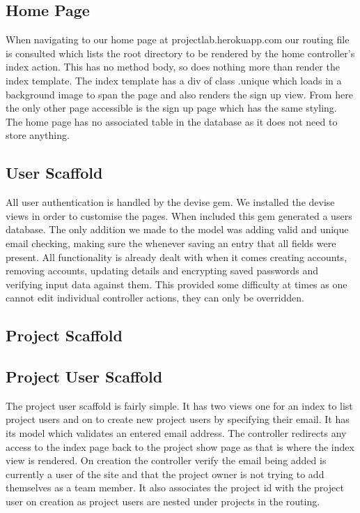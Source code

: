 \documentclass[a4wide, 11pt]{article}
\begin{document}
\subsection{Home Page}
When navigating to our home page at projectlab.herokuapp.com our routing file is consulted which lists the root directory to be rendered by the home controller’s index action. This has no method body, so does nothing more than render the index template. The index template has a div of class .unique which loads in a background image to span the page and also renders the sign up view. From here the only other page accessible is the sign up page which has the same styling. The home page has no associated table in the database as it does not need to store anything.

\subsection{User Scaffold}
All user authentication is handled by the devise gem. We installed the devise views in order to customise the pages. When included this gem generated a users database. The only addition we made to the model was adding valid and unique email checking, making sure the whenever saving an entry that all fields were present. All functionality is already dealt with when it comes creating accounts, removing accounts, updating details and encrypting saved passwords and verifying input data against them. This provided some difficulty at times as one cannot edit individual controller actions, they can only be overridden.

\subsection{Project Scaffold}

\subsection{Project User Scaffold}
The project user scaffold is fairly simple. It has two views one for an index to list project users and on to create new project users by specifying their email. It has its model which validates an entered email address. The controller redirects any access to the index page back to the project show page  as that is where the index view is rendered. On creation the controller verify the email being added is currently a user of the site and that the project owner is not trying to add themselves as a team member. It also associates the project id with the project user on creation as project users are nested under projects in the routing.
\end{document}
